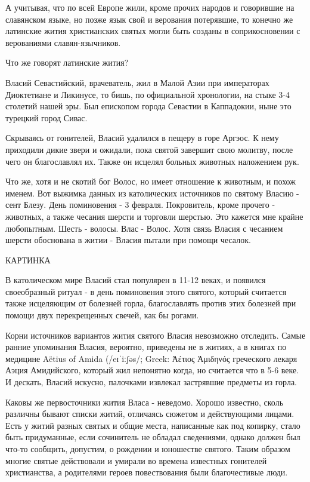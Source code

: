 \documentclass[a5paper,11pt,openany]{article}
\begin{document}
   А учитывая, что по всей Европе жили, кроме прочих народов и говорившие на славянском языке, но позже язык свой и верования потерявшие, то конечно же латинские жития христианских святых могли быть созданы в соприкосновении с верованиями славян-язычников.

   Что же говорят латинские жития?

   Власий Севастийский, врачеватель, жил в Малой Азии при императорах Диоктетиане и Ликинусе, то бишь, по официальной хронологии, на стыке 3-4 столетий нашей эры. Был епископом города Севастии в Каппадокии, ныне это турецкий город Сивас. 

   Скрываясь от гонителей, Власий удалился в пещеру в горе Аргэос. К нему приходили дикие звери и ожидали, пока святой завершит свою молитву, после чего он благославлял их. Также он исцелял больных животных наложением рук.

   Что же, хотя и не скотий бог Волос, но имеет отношение к животным, и похож именем. Вот выжимка данных из католических источников по святому Власию - сент Блезу. День поминовения - 3 февраля. Покровитель, кроме прочего - животных, а также чесания шерсти и торговли шерстью. Это кажется мне крайне любопытным. Шесть - волосы. Влас - Волос. Хотя связь Власия с чесанием шерсти обоснована в житии - Власия пытали при помощи чесалок.

КАРТИНКА

   В католическом мире Власий стал популярен в 11-12 веках, и появился своеобразный ритуал - в день поминовения этого святого, который считается также исцеляющим от болезней горла, благославлять против этих болезней при помощи двух перекрещенных свечей, как бы рогами.

   Корни источников вариантов жития святого Власия невозможно отследить. Самые ранние упоминания Власия, вероятно, приведены не в житиях, а в книгах по медицине Aëtius of Amida (/eɪˈiːʃəs/; Greek: Ἀέτιος Ἀμιδηνός греческого лекаря Аэция Амидийского, который жил непонятно когда, но считается что в 5-6 веке. И дескать, Власий искусно, палочками извлекал застрявшие предметы из горла. 

   Каковы же первосточники жития Власа - неведомо. Хорошо известно, сколь различны бывают списки житий, отличаясь сюжетом и действующими лицами. Есть у житий разных святых и общие места, написанные как под копирку, стало быть придуманные, если сочинитель не обладал сведениями, однако должен был что-то сообщить, допустим, о рождении и юношестве святого. Таким образом многие святые действовали и умирали во времена известных гонителей христианства, а родителями героев повествования были благочестивые люди. 
\end{document}
